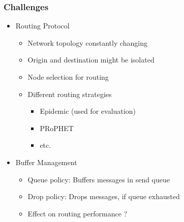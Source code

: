 \begin{frame}
  \frametitle{Challenges}  

  \begin{itemize}  
    \item Routing Protocol
    \vspace{0.3cm}
    \begin{itemize}
      \item Network topology constantly changing
      \vspace{0.1cm}
      \item Origin and destination might be isolated
      \vspace{0.1cm}
      \item Node selection for routing
      \vspace{0.1cm}
      \item Different routing strategies      
      \begin{itemize}
        \item Epidemic (used for evaluation)
        \vspace{0.1cm}
        \item PRoPHET
        \vspace{0.1cm}
        \item etc.
      \end{itemize}    
    \end{itemize}    
  \end{itemize}

  \vspace{0.3cm}

  \begin{itemize}  
    \item Buffer Management
    \vspace{0.3cm}
    \begin{itemize}
      \item Queue policy: Buffers messages in send queue
      \vspace{0.1cm}
      \item Drop policy: Drops messages, if queue exhausted
      \vspace{0.1cm}
      \item Effect on routing performance ?
    \end{itemize} 
  \end{itemize}

\end{frame}

